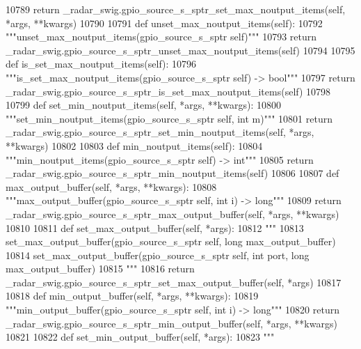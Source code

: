 \begin{DoxyCode}
{{{{{{{{{{{{{{{{{{{{{{{{{{{{{{{{{{10789         \textcolor{keywordflow}{return} \_radar\_swig.gpio\_source\_s\_sptr\_set\_max\_noutput\_items(self, *args, **kwargs)
10790 
10791     \textcolor{keyword}{def }unset_max_noutput_items(self):
10792         \textcolor{stringliteral}{"""unset\_max\_noutput\_items(gpio\_source\_s\_sptr self)"""}
10793         \textcolor{keywordflow}{return} \_radar\_swig.gpio\_source\_s\_sptr\_unset\_max\_noutput\_items(self)
10794 
10795     \textcolor{keyword}{def }is_set_max_noutput_items(self):
10796         \textcolor{stringliteral}{"""is\_set\_max\_noutput\_items(gpio\_source\_s\_sptr self) -> bool"""}
10797         \textcolor{keywordflow}{return} \_radar\_swig.gpio\_source\_s\_sptr\_is\_set\_max\_noutput\_items(self)
10798 
10799     \textcolor{keyword}{def }set_min_noutput_items(self, *args, **kwargs):
10800         \textcolor{stringliteral}{"""set\_min\_noutput\_items(gpio\_source\_s\_sptr self, int m)"""}
10801         \textcolor{keywordflow}{return} \_radar\_swig.gpio\_source\_s\_sptr\_set\_min\_noutput\_items(self, *args, **kwargs)
10802 
10803     \textcolor{keyword}{def }min_noutput_items(self):
10804         \textcolor{stringliteral}{"""min\_noutput\_items(gpio\_source\_s\_sptr self) -> int"""}
10805         \textcolor{keywordflow}{return} \_radar\_swig.gpio\_source\_s\_sptr\_min\_noutput\_items(self)
10806 
10807     \textcolor{keyword}{def }max_output_buffer(self, *args, **kwargs):
10808         \textcolor{stringliteral}{"""max\_output\_buffer(gpio\_source\_s\_sptr self, int i) -> long"""}
10809         \textcolor{keywordflow}{return} \_radar\_swig.gpio\_source\_s\_sptr\_max\_output\_buffer(self, *args, **kwargs)
10810 
10811     \textcolor{keyword}{def }set_max_output_buffer(self, *args):
10812         \textcolor{stringliteral}{"""}
10813 \textcolor{stringliteral}{        set\_max\_output\_buffer(gpio\_source\_s\_sptr self, long max\_output\_buffer)}
10814 \textcolor{stringliteral}{        set\_max\_output\_buffer(gpio\_source\_s\_sptr self, int port, long max\_output\_buffer)}
10815 \textcolor{stringliteral}{        """}
10816         \textcolor{keywordflow}{return} \_radar\_swig.gpio\_source\_s\_sptr\_set\_max\_output\_buffer(self, *args)
10817 
10818     \textcolor{keyword}{def }min_output_buffer(self, *args, **kwargs):
10819         \textcolor{stringliteral}{"""min\_output\_buffer(gpio\_source\_s\_sptr self, int i) -> long"""}
10820         \textcolor{keywordflow}{return} \_radar\_swig.gpio\_source\_s\_sptr\_min\_output\_buffer(self, *args, **kwargs)
10821 
10822     \textcolor{keyword}{def }set_min_output_buffer(self, *args):
10823         \textcolor{stringliteral}{"""}
}}}}}}}}}}}}}}}}}}}}}}}}}}}}}}}}}}
\end{DoxyCode}
